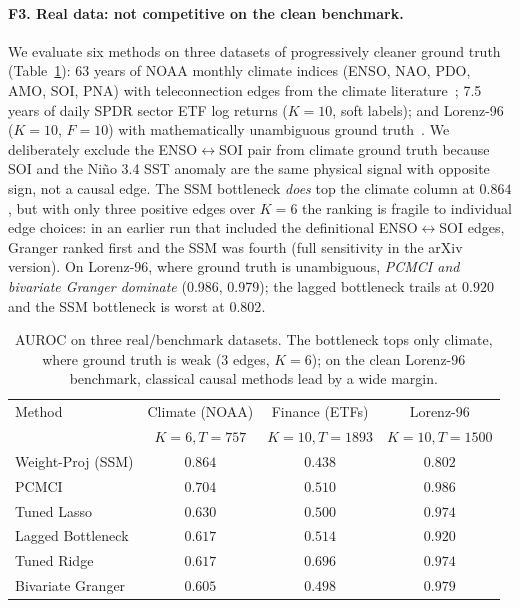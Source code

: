 \documentclass{article}
\begin{document}
\paragraph{F3. Real data: not competitive on the clean benchmark.} We
evaluate six methods on three datasets of progressively cleaner ground
truth (Table~\ref{tab:real}): 63 years of NOAA monthly climate indices
(ENSO, NAO, PDO, AMO, SOI, PNA) with teleconnection edges from the
climate literature~\citep{trenberth1994decadal,delworth2000observed,newman2016pdo};
7.5 years of daily SPDR sector ETF log returns ($K{=}10$, soft labels);
and Lorenz-96 ($K{=}10$, $F{=}10$) with mathematically unambiguous
ground truth~\citep{lorenz1996predictability}. We deliberately exclude
the ENSO$\leftrightarrow$SOI pair from climate ground truth because SOI
and the Niño 3.4 SST anomaly are the same physical signal with opposite
sign, not a causal edge. The SSM bottleneck \emph{does} top the climate
column at $0.864$, but with only three positive edges over $K{=}6$ the
ranking is fragile to individual edge choices: in an earlier run that
included the definitional ENSO$\leftrightarrow$SOI edges, Granger
ranked first and the SSM was fourth (full sensitivity in the arXiv
version). On Lorenz-96, where ground truth is unambiguous, \emph{PCMCI
and bivariate Granger dominate} (0.986, 0.979); the lagged bottleneck
trails at $0.920$ and the SSM bottleneck is worst at $0.802$.

\begin{table}[t]
\centering
\small
\caption{AUROC on three real/benchmark datasets. The bottleneck tops only
climate, where ground truth is weak (3 edges, $K{=}6$); on the clean
Lorenz-96 benchmark, classical causal methods lead by a wide margin.}
\label{tab:real}
\begin{tabular}{lccc}
\toprule
Method & Climate (NOAA) & Finance (ETFs) & Lorenz-96 \\
 & $K{=}6, T{=}757$ & $K{=}10, T{=}1893$ & $K{=}10, T{=}1500$ \\
\midrule
Weight-Proj (SSM) & $\mathbf{0.864}$ & $0.438$ & $0.802$ \\
PCMCI & $0.704$ & $0.510$ & $\mathbf{0.986}$ \\
Tuned Lasso & $0.630$ & $0.500$ & $0.974$ \\
Lagged Bottleneck & $0.617$ & $0.514$ & $0.920$ \\
Tuned Ridge & $0.617$ & $\mathbf{0.696}$ & $0.974$ \\
Bivariate Granger & $0.605$ & $0.498$ & $0.979$ \\
\bottomrule
\end{tabular}
\end{table}
\end{document}
